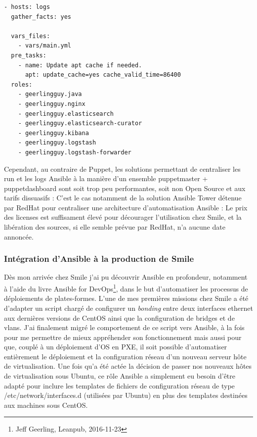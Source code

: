 \documentclass[14 pt,a4paper]{extreport}
\begin{document}
\begin{framed}
\begin{Verbatim}[fontsize=\scriptsize]
- hosts: logs
  gather_facts: yes
  
  vars_files:
    - vars/main.yml
  pre_tasks:
    - name: Update apt cache if needed.
	  apt: update_cache=yes cache_valid_time=86400
  roles:
    - geerlingguy.java
	- geerlingguy.nginx
	- geerlingguy.elasticsearch
	- geerlingguy.elasticsearch-curator
	- geerlingguy.kibana
	- geerlingguy.logstash
	- geerlingguy.logstash-forwarder
\end{Verbatim}
\end{framed}

Cependant, au contraire de Puppet, les solutions permettant de centraliser les run et les logs Ansible à la manière d'un ensemble puppetmaster + puppetdashboard sont soit trop peu performantes, soit non Open Source et aux tarifs dissuasifs : C'est le cas notamment de la solution Ansible Tower détenue par RedHat pour centraliser une architecture d'automatisation Ansible : Le prix des licenses est suffisament élevé pour décourager l'utilisation chez Smile, et la libération des sources, si elle semble prévue par RedHat, n'a aucune date annoncée.

\subsubsection{Intégration d'Ansible à la production de Smile}

Dès mon arrivée chez Smile j'ai pu découvrir Ansible en profondeur, notamment à l'aide du livre Ansible for DevOps\footnote{Jeff Geerling, Leanpub, 2016-11-23}, dans le but d'automatiser les processus de déploiements de plates-formes. L'une de mes premières missions chez Smile a été d'adapter un script chargé de configurer un \emph{bonding} entre deux interfaces ethernet aux dernières versions de CentOS ainsi que la configuration de bridges et de vlans. J'ai finalement migré le comportement de ce script vers Ansible, à la fois pour me permettre de mieux appréhender son fonctionnement mais aussi pour que, couplé à un déploiement d'OS en PXE, il soit possible d'automatiser entièrement le déploiement et la configuration réseau d'un nouveau serveur hôte de virtualisation. Une fois qu'a été actée la décision de passer nos nouveaux hôtes de virtualisation sous Ubuntu, ce rôle Ansible a simplement eu besoin d'être adapté pour inclure les templates de fichiers de configuration réseau de type /etc/network/interfaces.d (utilisées par Ubuntu) en plus des templates destinées aux machines sous CentOS.
\end{document}
